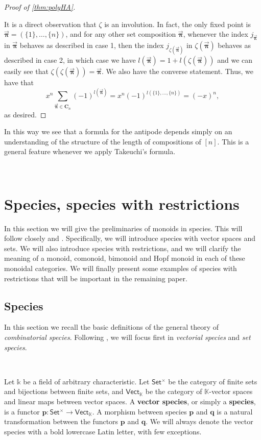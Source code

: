 \documentclass[12pt, reqno]{amsart}
\theoremstyle{definition}
\newcommand{\oPi}{\mathbf{C}}
\newcommand{\opi}{\vec{\boldsymbol{\pi}}}
\newcommand{\Fset}{\mathsf{Set^{\times}}}
\newcommand{\Vect}{\mathsf{Vect}}
\newcommand{\tp}{\mathbf{p}}
\newcommand{\tq}{\mathbf{q}}
\begin{document}
\begin{proof}[Proof of \cref{thm:polyHA}]
\begin{enumerate}
\end{enumerate}

It is a direct observation that $\zeta $ is an involution.
In fact, the only fixed point is $\opi = (\{1\}, \dots , \{n\})$, and for any other set composition $\opi$, whenever the index $j_{\opi}$ in $\opi $ behaves as described in case 1, then the index $j_{\zeta(\opi)}$ in $\zeta ( \opi ) $ behaves as described in case 2, in which case we have $l(\opi) = 1+l(\zeta (\opi))$ and we can easily see that $\zeta(\zeta(\opi )) = \opi$.
We also have the converse statement. Thus, we have that 
\[x^n \sum_{\opi \in \oPi_n} (-1)^{l(\opi)} = x^n (-1)^{l(\{1\}, \dots, \{n\} )}= (-x)^n,\] 
as desired.
\end{proof}


In this way we see that a formula for the antipode depends simply on an understanding of the structure of the length of compositions of $[n]$.
This is a general feature whenever we apply Takeuchi's formula.





\

\section{Species, species with restrictions\label{sec:species}}


In this section we will give the preliminaries of monoids in species.
This will follow closely \cite{AM2010} and \cite{Schmitt1993}.
Specifically, we will introduce species with vector spaces and sets.
We will also introduce species with restrictions, and we will clarify the meaning of a monoid, comonoid, bimonoid and Hopf monoid in each of these monoidal categories.
We will finally present some examples of species with restrictions that will be important in the remaining paper. 

\subsection{Species}
In this section we recall the basic definitions of the general theory of \emph{combinatorial species}. Following \cite{AM2010}, we will focus first in \emph{vectorial species} and \emph{set species}.

\

Let $\mathbb{k}$ be a field of arbitrary characteristic. Let $\Fset$ be the category of finite sets and bijections between finite sets, and $\Vect_{\mathbb{K}}$ be the category of $\mathbb{K}$-vector spaces and linear maps between vector spaces. A {\bf vector species}, or simply a \textbf{species}, is a functor $\tp: \Fset \to \Vect_{\mathbb{K}}$. A morphism between species $\tp$ and $\tq$ is a natural transformation between the functors $\tp$ and $\tq$.
We will always denote the vector species with a bold lowercase Latin letter, with few exceptions.
\end{document}

